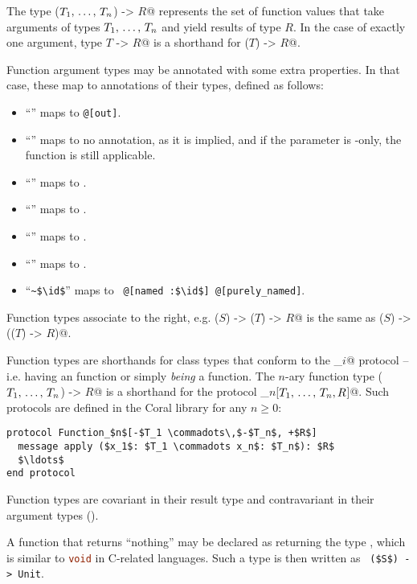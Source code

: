The type \lstinline@($T_1 ,\, \ldots ,\, T_n$) -> $R$@ represents the set of function values that take arguments of types $T_1 ,\, \ldots ,\, T_n$ and yield results of type $R$. In the case of exactly one argument, type \lstinline@$T$ -> $R$@ is a shorthand for \lstinline@($T$) -> $R$@. 

Function argument types may be annotated with some extra properties. In that case, these map to annotations of their types, defined as follows:
\begin{itemize}
\item ``'' maps to \lstinline[deletekeywords={out}]!@[out]!. 
\item ``'' maps to no annotation, as it is implied, and if the parameter is -only, the function is still applicable. 
\item ``\code{*}'' maps to . 
\item ``\code{**}'' maps to . 
\item ``\code{&}'' maps to . 
\item ``\code{$\id$}'' maps to . 
\item ``\lstinline!~$\id$!'' maps to ~\lstinline!@[named :$\id$] @[purely_named]!. 
\end{itemize}

Function types associate to the right, e.g. \lstinline@($S$) -> ($T$) -> $R$@ is the same as \lstinline@($S$) -> (($T$) -> $R$)@. 

Function types are shorthands for class types that conform to the \lstinline@Function_$i$@ protocol -- i.e. having an  function or simply {\em being} a function. The $n$-ary function type \lstinline@($T_1 ,\, \ldots ,\, T_n$) -> $R$@ is a shorthand for the protocol \lstinline@Function_$n$[$T_1 ,\, \ldots ,\, T_n,R$]@. Such protocols are defined in the Coral library for any $n \ge 0$:

\begin{lstlisting}
protocol Function_$n$[-$T_1 \commadots\,$-$T_n$, +$R$]
  message apply ($x_1$: $T_1 \commadots x_n$: $T_n$): $R$
  $\ldots$
end protocol
\end{lstlisting}

Function types are covariant in their result type and contravariant in their argument types ().

A function that returns ``nothing'' may be declared as returning the type , which is similar to \lstinline[language=C]!void! in C-related languages. Such a type is then written as ~\lstinline!($S$) -> Unit!. 

